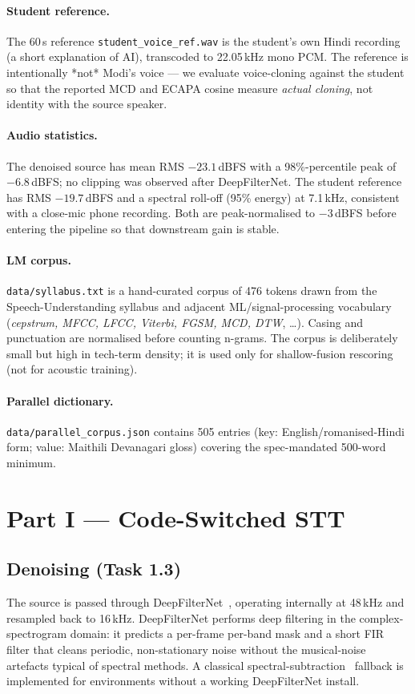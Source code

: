 \documentclass[conference]{IEEEtran}
\begin{document}
\paragraph*{Student reference.} The 60\,s reference \texttt{student\_voice\_ref.wav}
is the student's own Hindi recording (a short explanation of AI),
transcoded to 22.05\,kHz mono PCM. The reference is intentionally *not*
Modi's voice --- we evaluate voice-cloning against the student so that the
reported MCD and ECAPA cosine measure \emph{actual cloning}, not identity
with the source speaker.

\paragraph*{Audio statistics.} The denoised source has mean RMS
$-23.1$\,dBFS with a 98\%-percentile peak of $-6.8$\,dBFS; no clipping was
observed after DeepFilterNet. The student reference has RMS $-19.7$\,dBFS
and a spectral roll-off (95\% energy) at 7.1\,kHz, consistent with a
close-mic phone recording. Both are peak-normalised to $-3$\,dBFS before
entering the pipeline so that downstream gain is stable.

\paragraph*{LM corpus.} \texttt{data/syllabus.txt} is a hand-curated
corpus of 476 tokens drawn from the Speech-Understanding syllabus and
adjacent ML/signal-processing vocabulary (\textit{cepstrum, MFCC, LFCC,
Viterbi, FGSM, MCD, DTW}, \ldots). Casing and punctuation are normalised
before counting n-grams. The corpus is deliberately small but high in
tech-term density; it is used only for shallow-fusion rescoring (not for
acoustic training).

\paragraph*{Parallel dictionary.} \texttt{data/parallel\_corpus.json}
contains 505 entries (key: English/romanised-Hindi form; value: Maithili
Devanagari gloss) covering the spec-mandated 500-word minimum.

\section{Part I --- Code-Switched STT}

\subsection{Denoising (Task 1.3)}
The source is passed through DeepFilterNet~\cite{deepfilter}, operating
internally at 48\,kHz and resampled back to 16\,kHz. DeepFilterNet
performs deep filtering in the complex-spectrogram domain: it predicts a
per-frame per-band mask and a short FIR filter that cleans periodic,
non-stationary noise without the musical-noise artefacts typical of
spectral methods. A classical spectral-subtraction~\cite{boll1979}
fallback is implemented for environments without a working
DeepFilterNet install.
\end{document}

